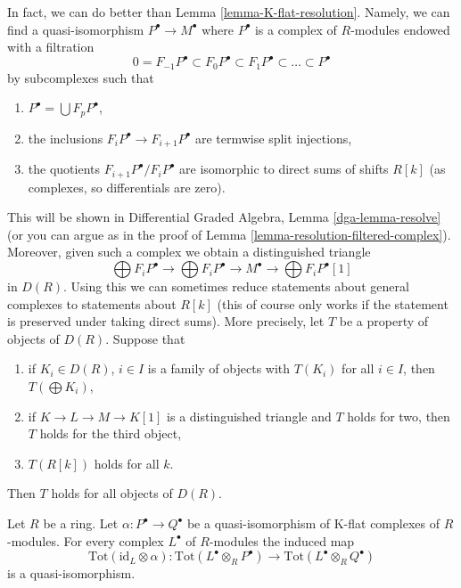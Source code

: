 \begin{remark}
\label{remark-P-resolution}
In fact, we can do better than Lemma \ref{lemma-K-flat-resolution}.
Namely, we can find a quasi-isomorphism
$P^\bullet \to M^\bullet$ where $P^\bullet$ is a complex of $R$-modules
endowed with a filtration
$$
0 = F_{-1}P^\bullet \subset F_0P^\bullet \subset
F_1P^\bullet \subset \ldots \subset P^\bullet
$$
by subcomplexes such that
\begin{enumerate}
\item $P^\bullet = \bigcup F_pP^\bullet$,
\item the inclusions $F_iP^\bullet \to F_{i + 1}P^\bullet$
are termwise split injections,
\item the quotients $F_{i + 1}P^\bullet/F_iP^\bullet$ are isomorphic to direct
sums of shifts $R[k]$ (as complexes, so differentials are zero).
\end{enumerate}
This will be shown in
Differential Graded Algebra, Lemma \ref{dga-lemma-resolve}
(or you can argue as in the proof of
Lemma \ref{lemma-resolution-filtered-complex}).
Moreover, given such a complex we obtain a distinguished triangle
$$
\bigoplus F_iP^\bullet \to \bigoplus F_iP^\bullet \to M^\bullet
\to \bigoplus F_iP^\bullet[1]
$$
in $D(R)$. Using this we can sometimes reduce statements about general
complexes to statements about $R[k]$ (this of course only works if the
statement is preserved under taking direct sums). More precisely, let
$T$ be a property of objects of $D(R)$. Suppose that
\begin{enumerate}
\item if $K_i \in D(R)$, $i \in I$ is a family of objects with
$T(K_i)$ for all $i \in I$, then $T(\bigoplus K_i)$,
\item if $K \to L \to M \to K[1]$ is a distinguished triangle and
$T$ holds for two, then $T$ holds for the third object,
\item $T(R[k])$ holds for all $k$.
\end{enumerate}
Then $T$ holds for all objects of $D(R)$.
\end{remark}

\begin{lemma}
\label{lemma-derived-tor-quasi-isomorphism-other-side}
Let $R$ be a ring. Let
$\alpha : P^\bullet \to Q^\bullet$ be a quasi-isomorphism of
K-flat complexes of $R$-modules. For every complex $L^\bullet$
of $R$-modules the induced map
$$
\text{Tot}(\text{id}_L \otimes \alpha) :
\text{Tot}(L^\bullet \otimes_R P^\bullet)
\longrightarrow
\text{Tot}(L^\bullet \otimes_R Q^\bullet)
$$
is a quasi-isomorphism.
\end{lemma}

